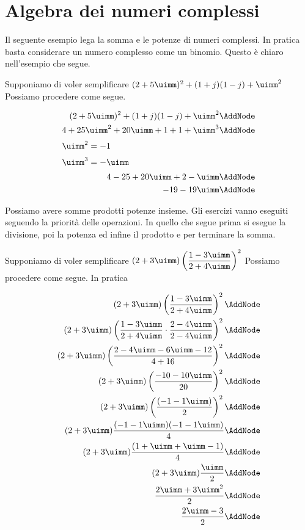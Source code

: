 \section{Algebra dei numeri complessi}
\label{sec:AlgebraNumeriComplessi}
Il seguente esempio lega la somma e le potenze di numeri complessi. In pratica basta considerare un numero complesso come un binomio. Questo è chiaro nell'esempio che segue.
\begin{esempio}
	Supponiamo di voler semplificare $(2+5\uimm)^2+(1+j)(1-j)+\uimm^2 $ Possiamo procedere come segue.
	\begin{NodesList} [margin=4cm]
		\begin{align*}
			(2+5\uimm)^2+(1+j)(1-j)+\uimm^2 \AddNode\\
			4+25\uimm^2+20\uimm+1+1+\uimm^3\AddNode\\
			\intertext{\hfil $\uimm^2=-1$}
			\intertext{\hfil $\uimm^3=-\uimm$}
			4-25+20\uimm+2-\uimm\AddNode\\
			-19-19\uimm\AddNode
		\end{align*}
	\end{NodesList}
\end{esempio}
Possiamo avere somme prodotti potenze insieme. Gli esercizi vanno eseguiti seguendo la priorità delle operazioni. In quello che segue  prima si esegue la divisione, poi la potenza ed infine il prodotto e per terminare la somma. 
\begin{esempio}
Supponiamo di voler semplificare $(2+3\uimm)\left(\dfrac{1-3\uimm}{2+4\uimm}\right)^2 $ Possiamo procedere come segue. In pratica
	\begin{NodesList} [margin=4cm]
		\begin{align*}
			(2+3\uimm)\left(\dfrac{1-3\uimm}{2+4\uimm}\right)^2 \AddNode\\
			(2+3\uimm)\left(\dfrac{1-3\uimm}{2+4\uimm}\cdot\dfrac{2-4\uimm}{2-4\uimm}\right)^2\AddNode\\
			(2+3\uimm)\left(\dfrac{2-4\uimm-6\uimm-12}{4+16}\right)^2\AddNode\\
			(2+3\uimm)\left(\dfrac{-10-10\uimm}{20}\right)^2\AddNode\\
			(2+3\uimm)\left(\dfrac{(-1-1\uimm)}{2}\right)^2\AddNode\\
			(2+3\uimm)\dfrac{(-1-1\uimm)(-1-1\uimm)}{4}\AddNode\\
			(2+3\uimm)\dfrac{(1+\uimm+\uimm-1)}{4}\AddNode\\
			(2+3\uimm)\dfrac{\uimm}{2}\AddNode\\
			\dfrac{2\uimm+3\uimm^2}{2}\AddNode\\
			\dfrac{2\uimm-3}{2}\AddNode
		\end{align*}
	\end{NodesList}
\end{esempio}
